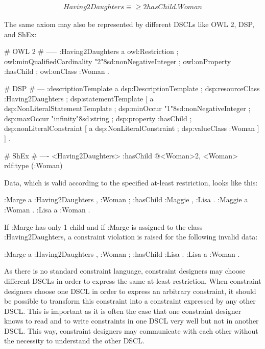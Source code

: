 \documentclass{llncs}
\begin{document}
\begin{align*}
Having2Daughters \equiv \geq 2 hasChild.Woman
\end{align*}

The same axiom may also be represented by different DSCLs like OWL 2, DSP, and ShEx:

\begin{ex}
# OWL 2
# -----
:Having2Daughters
    a owl:Restriction ;
    owl:minQualifiedCardinality "2"^^xsd:nonNegativeInteger ;
    owl:onProperty :hasChild ;
    owl:onClass :Woman .
		
# DSP
# ---			
:descriptionTemplate 
    a dsp:DescriptionTemplate ; 
    dsp:resourceClass :Having2Daughters ; 
    dsp:statementTemplate [
        a dsp:NonLiteralStatementTemplate ;
        dsp:minOccur "1"^^xsd:nonNegativeInteger ; 
        dsp:maxOccur "infinity"^^xsd:string ; 
        dsp:property :hasChild ; 
        dsp:nonLiteralConstraint [ 
            a dsp:NonLiteralConstraint ;
            dsp:valueClass :Woman ] ] .

# ShEx
# ----
<Having2Daughters> {         
    :hasChild @<Woman>{2, }
}
<Woman> {         
    rdf:type (:Woman)
}
\end{ex}

Data, which is valid according to the specified at-least restriction, looks like this:

\begin{ex}
:Marge
    a :Having2Daughters , :Woman ;
    :hasChild :Maggie , :Lisa .
:Maggie
    a :Woman .
:Lisa
    a :Woman .
\end{ex}

If :Marge has only 1 child and if :Marge is assigned to the class :Having2Daughters, a constraint violation is raised for the following invalid data:

\begin{ex}
:Marge
    a :Having2Daughters , :Woman ;
    :hasChild :Lisa .
:Lisa
    a :Woman .
\end{ex}

As there is no standard constraint language, constraint designers may choose different DSCLs in order to express the same at-least restriction. 
When constraint designers choose one DSCL in order to express an arbitrary constraint, it should be possible to transform this constraint into a constraint expressed by any other DSCL. 
This is important as it is often the case that one constraint designer knows to read and to write constraints in one DSCL very well but not in another DSCL. 
This way, constraint designers may communicate with each other without the necessity to understand the other DSCL.
\end{document}
